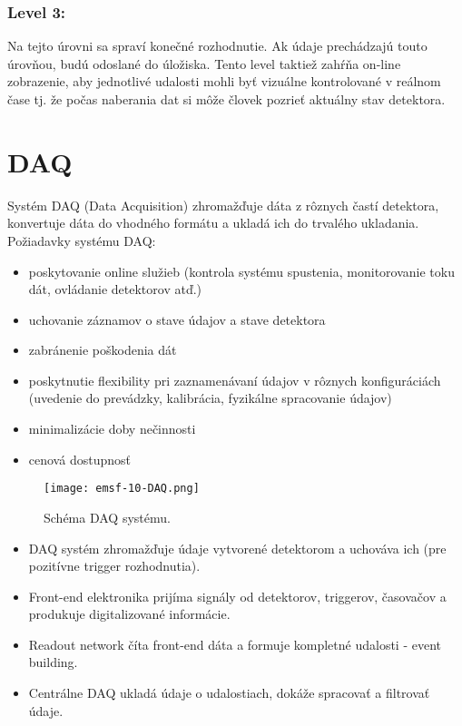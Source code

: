 \documentclass[../../main.tex]{subfiles}
\begin{document}
\subsubsection{Level 3:}
Na tejto úrovni sa spraví konečné rozhodnutie. Ak údaje prechádzajú touto úrovňou, budú odoslané do úložiska. Tento level taktiež zahŕňa on-line zobrazenie, aby jednotlivé udalosti mohli byť vizuálne kontrolované v reálnom čase tj. že počas naberania dat si môže človek pozrieť aktuálny stav detektora.

\section{DAQ}
Systém DAQ (Data Acquisition) zhromažďuje dáta z rôznych častí detektora, konvertuje dáta do vhodného formátu a ukladá ich do trvalého ukladania. Požiadavky systému DAQ:
\begin{itemize}
\item poskytovanie online služieb (kontrola systému spustenia, monitorovanie toku dát, ovládanie detektorov atď.)
\item uchovanie záznamov o stave údajov a stave detektora
\item zabránenie poškodenia dát
\item poskytnutie flexibility pri zaznamenávaní údajov v rôznych konfiguráciách (uvedenie do prevádzky, kalibrácia, fyzikálne spracovanie údajov)
\item minimalizácie doby nečinnosti
\item cenová dostupnosť
\end{itemize}

\begin{figure}[!h]
\texttt{[image: emsf-10-DAQ.png]}
\centering
\caption{Schéma DAQ systému.}
\label{em10:fig:daq}
\end{figure}

\begin{itemize}
\item DAQ systém zhromažďuje údaje vytvorené detektorom a uchováva ich (pre pozitívne trigger rozhodnutia).
\item Front-end elektronika prijíma signály od detektorov, triggerov, časovačov a produkuje digitalizované informácie.
\item Readout network číta front-end dáta a formuje kompletné udalosti - event building.
\item Centrálne DAQ ukladá údaje o udalostiach, dokáže spracovať a filtrovať údaje.
\end{itemize}
\end{document}
